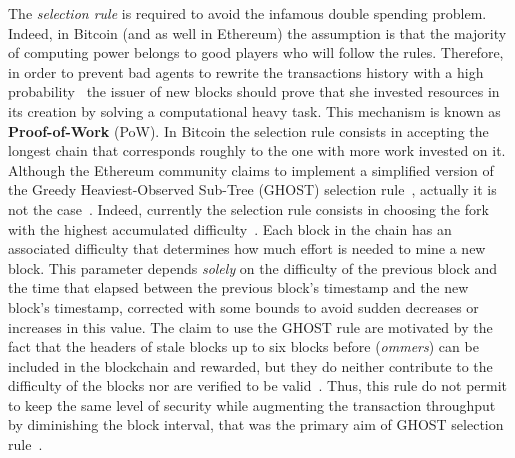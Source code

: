 The \emph{selection rule} is required to avoid the infamous double spending
problem. Indeed, in Bitcoin (and as well in Ethereum) the assumption is that the
majority of computing power belongs to good players who will follow the
rules. Therefore, in order to prevent bad agents
to rewrite the transactions history with a high probability~\cite{bib:bitcoin}
the issuer of new blocks should prove that she invested resources in its
creation
by solving a computational heavy task. This mechanism is known as
\textbf{Proof-of-Work} (PoW). In Bitcoin the selection rule consists in
accepting the longest chain that corresponds roughly to the one with more work
invested on it.
Although the Ethereum community claims to implement a simplified version of
the Greedy Heaviest-Observed Sub-Tree (GHOST) selection
rule~\cite{wood2018ethereum}, actually it is not the
case~\cite{bib:securityAndScalabilityPoW}.
Indeed, currently the selection rule consists in choosing the fork with the
highest accumulated difficulty~\cite{wood2018ethereum}. Each block in the
chain has an associated difficulty that determines how much effort is needed to
mine a new block. This parameter depends \emph{solely} on the difficulty of
the previous block and the time that elapsed between the previous block's 
timestamp and the new block's timestamp, corrected with some bounds to avoid 
sudden decreases or increases in this value. The claim to use the GHOST rule
are motivated by the fact that the headers of stale blocks up to six blocks
before 
(\emph{ommers}) can be included in the blockchain and rewarded, 
but they do neither contribute
to the difficulty of the blocks nor are verified to be 
valid~\cite{bib:securityAndScalabilityPoW}.
Thus, this rule do not permit to keep the same
level of security while augmenting the transaction throughput by diminishing
the block interval, that was the primary aim of GHOST selection
rule~\cite{bib:ghost}.





